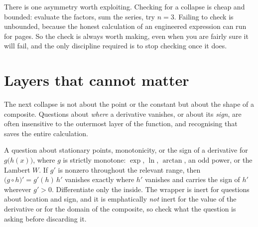 There is one asymmetry worth exploiting. Checking for a collapse is cheap and bounded: evaluate the factors, sum the series, try $n=3$. Failing to check is unbounded, because the honest calculation of an engineered expression can run for pages. So the check is always worth making, even when you are fairly sure it will fail, and the only discipline required is to stop checking once it does.

\section{Layers that cannot matter}

The next collapse is not about the point or the constant but about the shape of a composite. Questions about \emph{where} a derivative vanishes, or about its \emph{sign}, are often insensitive to the outermost layer of the function, and recognising that saves the entire calculation.

\cue A question about stationary points, monotonicity, or the sign of a derivative for $g\bigl(h(x)\bigr)$, where $g$ is strictly monotone: $\exp$, $\ln$, $\arctan$, an odd power, or the Lambert $W$.
\method If $g'$ is nonzero throughout the relevant range, then $\bigl(g\circ h\bigr)'=g'(h)\,h'$ vanishes exactly where $h'$ vanishes and carries the sign of $h'$ wherever $g'>0$. Differentiate only the inside. The wrapper is inert for questions about location and sign, and it is emphatically \emph{not} inert for the value of the derivative or for the domain of the composite, so check what the question is asking before discarding it.

